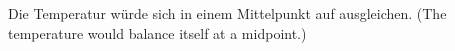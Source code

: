 Die Temperatur würde sich in einem Mittelpunkt auf ausgleichen.  
(The temperature would balance itself at a midpoint.)